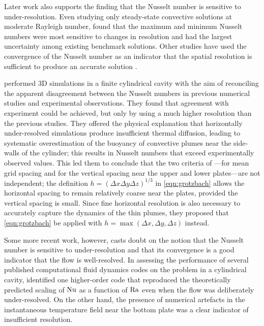 \documentclass[../main.tex]{subfiles}
\begin{document}
Later work also supports the finding that the Nusselt number is sensitive to
under-resolution. Even studying only steady-state convective solutions at
moderate Rayleigh number, \textcite{le_quere1991} found that the maximum and
minimum Nusselt numbers were most sensitive to changes in resolution and had
the largest uncertainty among existing benchmark solutions.
Other studies have used the convergence of the Nusselt number as an indicator
that the spatial resolution is sufficient to produce an accurate solution
\parencite{ouertatani2008}.

\textcite{stevens2010} performed 3D simulations in a finite cylindrical cavity
with the aim of reconciling the apparent disagreement between the Nusselt
numbers in previous numerical studies and experimental observations. They found
that agreement with experiment could be achieved, but only by using a much
higher resolution than the previous studies. They offered the physical
explanation that horizontally under-resolved simulations produce insufficient
thermal diffusion, leading to systematic overestimation of the buoyancy of
convective plumes near the side-walls of the cylinder; this results in Nusselt
numbers that exceed experimentally observed values. This led them to conclude
that the two criteria of \textcite{grotzbach1983}---for mean grid spacing and
for the vertical spacing near the upper and lower plates---are not independent;
the definition $h = (\Delta x \Delta y \Delta z)^{1/3}$ in \cref{eqn:grotzbach}
allows the horizontal spacing to remain relatively coarse near the plates,
provided the vertical spacing is small. Since fine horizontal resolution is
also necessary to accurately capture the dynamics of the thin plumes, they
proposed that \cref{eqn:grotzbach} be applied with $h = \max(\Delta x, \Delta
y, \Delta z)$ instead.

Some more recent work, however, casts doubt on the notion that the Nusselt
number is sensitive to under-resolution and that its convergence is a good
indicator that the flow is well-resolved. In assessing the performance of
several published computational fluid dynamics codes on the \rb{} problem in a
cylindrical cavity, \textcite{kooij2018} identified one higher-order code that
reproduced the theoretically predicted scaling of $\mathrm{Nu}$ as a function of
$\mathrm{Ra}$ even when the flow was deliberately under-resolved. On the other
hand, the presence of numerical artefacts in the instantaneous temperature
field near the bottom plate was a clear indicator of insufficient resolution.
\end{document}
